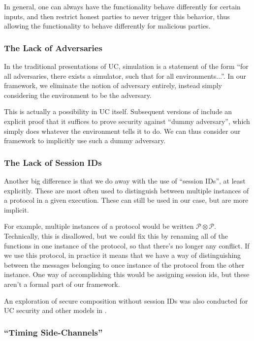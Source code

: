 In general, one can always have the functionality
behave differently for certain inputs,
and then restrict honest parties to never trigger this behavior,
thus allowing the functionality to behave differently
for malicious parties.

\subsubsection*{The Lack of Adversaries}

In the traditional presentations of UC,
simulation is a statement of the form ``for all adversaries,
there exists a simulator, such that for all environments...''.
In our framework, we eliminate the notion of adversary
entirely, instead simply considering the environment
to be the adversary.

This is actually a possibility in UC itself.
Subsequent versions of \cite{EPRINT:Canetti00} include
an explicit proof that it suffices to prove security against ``dummy adversary'',
which simply does whatever the environment tells it to do.
We can thus consider our framework to implicitly use such a dummy adversary.

\subsubsection*{The Lack of Session IDs}

Another big difference is that we do away with the use of ``session IDs'',
at least explicitly.
These are most often used to distinguish between multiple
instances of a protocol in a given execution.
These can still be used in our case, but are more implicit.

For example, multiple instances of a protocol would be written
$\mathscr{P} \otimes \mathscr{P}$.
Technically, this is disallowed, but we could fix this
by renaming all of the functions in one instance of the protocol,
so that there's no longer any conflict.
If we use this protocol, in practice it means that we
have a way of distinguishing between the messages belonging
to once instance of the protocol from the other instance.
One way of accomplishing this would be assigning session ids,
but these aren't a formal part of our framework.

An exploration of secure composition without session IDs
was also conducted for UC security and other models
in \cite{CCS:KusTue11}.

\subsubsection*{``Timing Side-Channels''}

